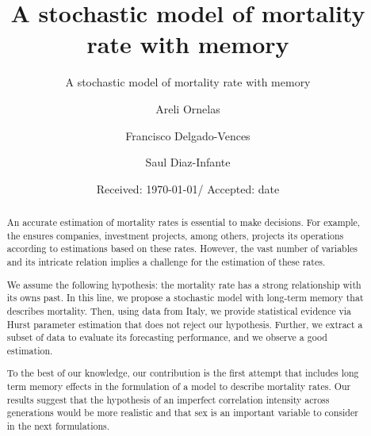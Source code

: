\documentclass[smallextended]{svjour3}
\begin{document}
    \title{A stochastic model of mortality rate with memory}

    \subtitle{A stochastic model of mortality rate with memory}
    \author{Areli Ornelas
        \and
        Francisco Delgado-Vences
        \and
        Saul Diaz-Infante
    }
%
    \date{Received: \today / Accepted: date}
    \maketitle
%
\begin{abstract}
        An accurate estimation of mortality rates is essential to make
    decisions. For example, the ensures companies, investment projects, among
    others, projects its operations according to estimations  based on  these
    rates. However, the vast number of variables and its intricate relation
    implies a challenge for the estimation of these rates.

        We assume the following hypothesis: the mortality rate has a strong
    relationship with its owns past. In this line, we propose a stochastic
    model with long-term memory that describes mortality. Then, using data from
    Italy, we provide statistical evidence via Hurst parameter estimation that
    does not reject our hypothesis. Further, we extract a subset of data to
    evaluate its forecasting performance, and we observe a good estimation.

        To the best of our knowledge, our contribution is the first attempt
    that includes long term memory effects in the formulation of a model to
    describe mortality rates. Our results suggest that the hypothesis of an
    imperfect correlation intensity across generations would be more realistic
    and that sex is an important variable to consider in the next formulations.
\end{abstract}
%
%
\end{document}
